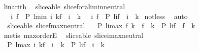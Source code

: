 \begin{isabellebody}
%
\isadelimproof
%
\endisadelimproof
%
\isatagproof
{}\isamarkupfalse%
\ linarith%
\endisatagproof
{\isafoldproof}%
%
\isadelimproof
\isanewline
%
\endisadelimproof
\isanewline
{}\isamarkupfalse%
\ {\isacharparenleft}\ sliceable{\isacharparenright}\ slice{\isacharunderscore}foral{\isacharunderscore}i{\isacharunderscore}min{\isacharunderscore}neutral{\isacharcolon}\ \isanewline
\ \ {\isachardoublequoteopen}{\isacharparenleft}{\isasymforall}\ i\ f\ {\isachardot}\ P\ {\isacharparenleft}l{\isasymdagger}{\isacharparenleft}min\ i\ k{\isacharparenright}{\isachardot}{\isachardot}f{\isacharparenright}\ {\isasymand}\ i\ {\isasymle}\ k{\isacharparenright}\ {\isasymlongleftrightarrow}\ {\isacharparenleft}{\isasymforall}\ i\ f\ {\isachardot}\ P\ {\isacharparenleft}l{\isasymdagger}i{\isachardot}{\isachardot}f{\isacharparenright}\ {\isasymand}\ i\ {\isasymle}\ k{\isacharparenright}{\isachardoublequoteclose}\isanewline
%
\isadelimproof
%
\endisadelimproof
%
\isatagproof
{}\isamarkupfalse%
\ not{\isacharunderscore}less\ \isamarkupfalse%
\ auto%
\endisatagproof
{\isafoldproof}%
%
\isadelimproof
\isanewline
%
\endisadelimproof
\isanewline
{}\isamarkupfalse%
\ {\isacharparenleft}\ sliceable{\isacharparenright}\ slice{\isacharunderscore}f{\isacharunderscore}max{\isacharunderscore}neutral{\isacharcolon}\ \isanewline
\ \ {\isachardoublequoteopen}{\isacharparenleft}P\ {\isacharparenleft}l{\isasymdagger}i{\isachardot}{\isachardot}{\isacharparenleft}max\ f\ k{\isacharparenright}{\isacharparenright}\ {\isasymand}\ f\ {\isasymge}\ k{\isacharparenright}\ {\isasymlongleftrightarrow}\ {\isacharparenleft}P\ {\isacharparenleft}l{\isasymdagger}i{\isachardot}{\isachardot}f{\isacharparenright}\ {\isasymand}\ f\ {\isasymge}\ k{\isacharparenright}{\isachardoublequoteclose}\isanewline
%
\isadelimproof
%
\endisadelimproof
%
\isatagproof
{}\isamarkupfalse%
\ {\isacharparenleft}metis\ max{\isachardot}orderE{\isacharparenright}%
\endisatagproof
{\isafoldproof}%
%
\isadelimproof
\isanewline
%
\endisadelimproof
\isanewline
{}\isamarkupfalse%
\ {\isacharparenleft}\ sliceable{\isacharparenright}\ slice{\isacharunderscore}i{\isacharunderscore}max{\isacharunderscore}neutral{\isacharcolon}\ \isanewline
\ \ {\isachardoublequoteopen}{\isacharparenleft}P\ {\isacharparenleft}l{\isasymdagger}{\isacharparenleft}max\ i\ k{\isacharparenright}{\isachardot}{\isachardot}f{\isacharparenright}\ {\isasymand}\ i\ {\isasymge}\ k{\isacharparenright}\ {\isasymlongleftrightarrow}\ {\isacharparenleft}P\ {\isacharparenleft}l{\isasymdagger}i{\isachardot}{\isachardot}f{\isacharparenright}\ {\isasymand}\ i\ {\isasymge}\ k{\isacharparenright}{\isachardoublequoteclose}\isanewline

\end{isabellebody}
